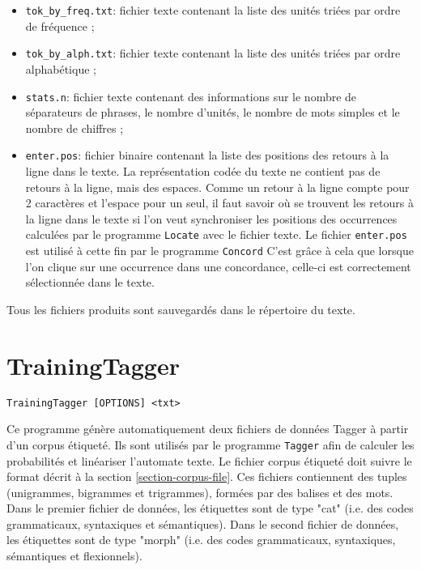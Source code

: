 \begin{itemize}
  \item \verb+tok_by_freq.txt+: fichier texte contenant la liste des unités triées par ordre de
  	  fréquence ;
  \item \verb+tok_by_alph.txt+: fichier texte contenant la liste des unités triées par ordre
  	  alphabétique ;

  \item \verb+stats.n+: fichier texte contenant des informations sur le nombre de séparateurs de
phrases, le nombre d’unités, le nombre de mots simples et le nombre de chiffres ;


  \item \verb+enter.pos+: fichier binaire contenant la liste des positions des retours à la ligne
  dans le texte. La représentation codée du texte ne contient pas de retours à la ligne, mais des
  espaces. Comme un retour à la ligne compte pour 2 caractères et l’espace pour un seul, il faut
  savoir où se trouvent les retours à la ligne dans le texte si l’on veut synchroniser les positions
  des occurrences calculées par le programme \verb+Locate+ avec le fichier texte. Le fichier \verb+enter.pos+ est utilisé à cette fin par le programme \verb+Concord+
  C’est grâce à cela que lorsque l’on clique sur une occurrence dans une concordance, celle-ci est
  correctement sélectionnée dans le texte.

\end{itemize}

\bigskip
\noindent Tous les fichiers produits sont sauvegardés dans le répertoire du texte.






\section{TrainingTagger}
\verb+TrainingTagger [OPTIONS] <txt>+
\label{section-TrainingTagger}

\bigskip
\noindent {}Ce programme génère automatiquement deux
fichiers de données Tagger à partir d'un corpus étiqueté. Ils sont utilisés par le programme
\verb+Tagger+ afin de calculer les probabilités et linéariser l'automate texte. Le fichier corpus
étiqueté doit suivre le format décrit à la section \ref{section-corpus-file}. Ces fichiers
contiennent des tuples (unigrammes, bigrammes et trigrammes), formées par des balises et des mots.
Dans le premier fichier de données, les étiquettes sont de type "cat" (i.e. des codes grammaticaux,
	syntaxiques et sémantiques). 
Dans le second fichier de données, les étiquettes sont de type "morph" (i.e. des codes
	grammaticaux, syntaxiques, sémantiques et flexionnels). 

